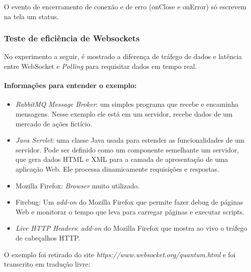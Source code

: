 \documentclass[a4paper,12pt]{article}
\begin{document}
O evento de encerramento de conexão e de erro (onClose e onError) só escrevem na tela um status.





\subsubsection{Teste de eficiência de Websockets}


No experimento a seguir, é mostrado a diferença de tráfego de dados e latência entre WebSocket e \emph{Polling} para requisitar dados em tempo real.


\paragraph{Informações para entender o exemplo:}
\begin{itemize}
    \item \emph{RabbitMQ Message Broker}: um simples programa que recebe e encaminha mensagens. Nesse exemplo ele está em um servidor, recebe dados de um mercado de ações fictício. %
    \item \emph{Java Servlet}: uma classe Java usada para estender as funcionalidades de um servidor. Pode ser definido como um componente semelhante um servidor, que gera dados HTML e XML para a camada de apresentação de uma aplicação Web. Ele processa dinamicamente requisições e respostas. %
    \item Mozilla Firefox: \emph{Browser} muito utilizado.
    \item Firebug: Um \emph{add-on} do Mozilla Firefox que permite fazer debug de páginas Web e monitorar o tempo que leva para carregar páginas e executar scripts.
    \item \emph{Live HTTP Headers}: \emph{add-on} do Mozilla Firefox que mostra ao vivo o tráfego de cabeçalhos HTTP.
\end{itemize}

 O exemplo foi retirado do site \emph{https://www.websocket.org/quantum.html} e foi transcrito em tradução livre:
\end{document}
